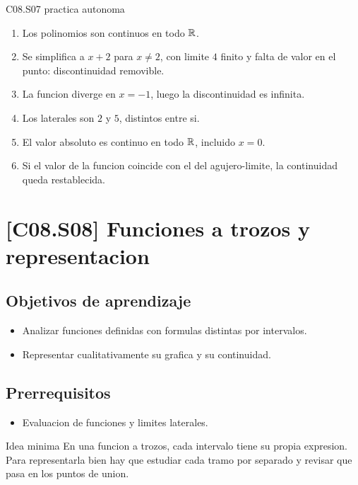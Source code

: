 \begin{fullsolution}{C08.S07 practica autonoma}
\begin{enumerate}[label=\textbf{PX-C08.S07-\arabic*:}, leftmargin=*]
  \item Los polinomios son continuos en todo \(\mathbb{R}\).
  \item Se simplifica a \(x+2\) para \(x\neq 2\), con limite \(4\) finito y falta de valor en
  el punto: discontinuidad removible.
  \item La funcion diverge en \(x=-1\), luego la discontinuidad es infinita.
  \item Los laterales son \(2\) y \(5\), distintos entre si.
  \item El valor absoluto es continuo en todo \(\mathbb{R}\), incluido \(x=0\).
  \item Si el valor de la funcion coincide con el del agujero-limite, la continuidad queda
  restablecida.
\end{enumerate}
\end{fullsolution}

\section{[C08.S08] Funciones a trozos y representacion}

\subsection*{Objetivos de aprendizaje}
\begin{itemize}
  \item Analizar funciones definidas con formulas distintas por intervalos.
  \item Representar cualitativamente su grafica y su continuidad.
\end{itemize}

\subsection*{Prerrequisitos}
\begin{itemize}
  \item Evaluacion de funciones y limites laterales.
\end{itemize}

\begin{theorybox}{Idea minima}
En una funcion a trozos, cada intervalo tiene su propia expresion. Para representarla bien hay
que estudiar cada tramo por separado y revisar que pasa en los puntos de union.
\end{theorybox}


